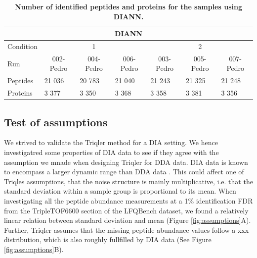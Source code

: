 \documentclass[10pt,letterpaper]{article}
\begin{document}
\begin{table}[H]
\begin{tabular}{lllllll}
\hline
\multicolumn{7}{c}{DIANN}                                                                                                                                                                                 \\ \hline
Condition & \multicolumn{3}{c}{1}                                                                         & \multicolumn{3}{c}{2}                                                                         \\
Run       & \multicolumn{1}{c}{002-Pedro} & \multicolumn{1}{c}{004-Pedro} & \multicolumn{1}{c}{006-Pedro} & \multicolumn{1}{c}{003-Pedro} & \multicolumn{1}{c}{005-Pedro} & \multicolumn{1}{c}{007-Pedro} \\
Peptides  & 21 036                        & 20 783                        & 21 040                        & 21 243                        & 21 325                        & 21 248                        \\
Proteins  & 3 377                         & 3 350                         & 3 368                         & 3 358                         & 3 381                         & 3 356                         \\ \hline
\end{tabular}
 \caption{{\bf Number of identified peptides and proteins for the samples using DIANN.}
      \label{fig:diann_peptide_and_protein_id}}
\end{table}

\subsection*{Test of assumptions}

We strived to validate the Triqler method for a DIA setting. We hence investigatred some properties of DIA data to see if they agree with the assumption we mnade when designing Triqler for DDA data. DIA data is known to encompass a larger dynamic range than DDA data . This could affect one of Triqles assumptions, that the noise structure is mainly multiplicative, i.e. that the standard deviation within a sample group is proportional to its mean. When investigating all the peptide abundance measurements at a 1\% identification FDR from the TripleTOF6600 section of the LFQBench dataset, we found a relatively linear relation between standard deviation and mean (Figure \ref{fig:assumptions}A). Further, Triqler assumes that the missing peptide abundance values follow a xxx distribution, which is also roughly fullfilled by DIA data (See Figure \ref{fig:assumptions}B).
\end{document}
